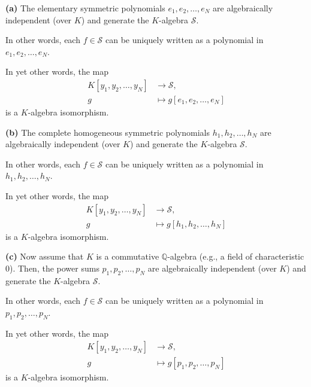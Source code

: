 \begin{theorem}
\label{thm.sf.ftsf}
\leantarget
\leanok
\textbf{(a)} The elementary symmetric polynomials $e_1, e_2, \ldots, e_N$
are algebraically independent (over $K$) and generate the $K$-algebra $\mathcal{S}$.

In other words, each $f \in \mathcal{S}$ can be uniquely written as a polynomial
in $e_1, e_2, \ldots, e_N$.

In yet other words, the map
\begin{align*}
K[y_1, y_2, \ldots, y_N] &\to \mathcal{S}, \\
g &\mapsto g[e_1, e_2, \ldots, e_N]
\end{align*}
is a $K$-algebra isomorphism. \medskip

\textbf{(b)} The complete homogeneous symmetric polynomials $h_1, h_2, \ldots, h_N$
are algebraically independent (over $K$) and generate the $K$-algebra $\mathcal{S}$.

In other words, each $f \in \mathcal{S}$ can be uniquely written as a polynomial
in $h_1, h_2, \ldots, h_N$.

In yet other words, the map
\begin{align*}
K[y_1, y_2, \ldots, y_N] &\to \mathcal{S}, \\
g &\mapsto g[h_1, h_2, \ldots, h_N]
\end{align*}
is a $K$-algebra isomorphism. \medskip

\textbf{(c)} Now assume that $K$ is a commutative $\mathbb{Q}$-algebra (e.g.,
a field of characteristic $0$). Then, the power sums $p_1, p_2, \ldots, p_N$
are algebraically independent (over $K$) and generate the $K$-algebra $\mathcal{S}$.

In other words, each $f \in \mathcal{S}$ can be uniquely written as a polynomial
in $p_1, p_2, \ldots, p_N$.

In yet other words, the map
\begin{align*}
K[y_1, y_2, \ldots, y_N] &\to \mathcal{S}, \\
g &\mapsto g[p_1, p_2, \ldots, p_N]
\end{align*}
is a $K$-algebra isomorphism.
\end{theorem}

